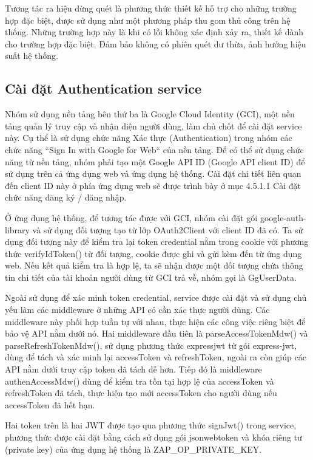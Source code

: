 Tương tác ra hiệu dừng quét là phương thức thiết kế hỗ trợ cho những trường hợp đặc biệt, được sử dụng như một phương pháp thu gom thủ công trên hệ thống. Những trường hợp này là khi có lỗi không xác định xảy ra, thiết kế dành cho trường hợp đặc biệt. Đảm bảo không có phiên quét dư thừa, ảnh hưởng hiệu suất hệ thống.

\subsection{Cài đặt Authentication service}

\tab Nhóm sử dụng nền tảng bên thứ ba là Google Cloud Identity (GCI), một nền tảng quản lý truy cập và nhận diện người dùng, làm chủ chốt để cài đặt service này. Cụ thể là sử dụng chức năng Xác thực (Authentication) trong nhóm các chức năng “Sign In with Google for Web“ của nền tảng. Để có thể sử dụng chức năng từ nền tảng, nhóm phải tạo một Google API ID (Google API client ID) để sử dụng trên cả ứng dụng web và ứng dụng hệ thống. Cài đặt chi tiết liên quan đến client ID này ở phía ứng dụng web sẽ được trình bày ở mục 4.5.1.1 Cài đặt chức năng đăng ký / đăng nhập.
\par

Ở ứng dụng hệ thống, để tương tác được với GCI, nhóm cài đặt gói google-auth-library và sử dụng đối tượng tạo từ lớp OAuth2Client với client ID đã có. Ta sử dụng đối tượng này để kiểm tra lại token credential nằm trong cookie với phương thức verifyIdToken() từ đối tượng, cookie được ghi và gửi kèm đến từ ứng dụng web. Nếu kết quả kiểm tra là hợp lệ, ta sẽ nhận được một đối tượng chứa thông tin chi tiết của tài khoản người dùng từ GCI trả về, nhóm gọi là GgUserData.
\par

Ngoài sử dụng để xác minh token credential, service được cài đặt và sử dụng chủ yếu làm các middleware ở những API có cần xác thực người dùng. Các middleware này phối hợp tuần tự với nhau, thực hiện các công việc riêng biệt để bảo vệ API nằm dưới nó. Hai middleware đầu tiên là parseAccessTokenMdw() và parseRefreshTokenMdw(), sử dụng phương thức expressjwt từ gói express-jwt, dùng để tách và xác minh lại accessToken và refreshToken, ngoài ra còn giúp các API nằm dưới truy cập token đã tách dễ hơn. Tiếp đó là middleware authenAccessMdw() dùng để kiểm tra tồn tại hợp lệ của accessToken và refreshToken đã tách, thực hiện tạo mới accessToken cho người dùng nếu accessToken đã hết hạn.
\par

Hai token trên là hai JWT được tạo qua phương thức signJwt() trong service, phương thức được cài đặt bằng cách sử dụng gói jsonwebtoken và khóa riêng tư (private key) của ứng dụng hệ thống là ZAP\_OP\_PRIVATE\_KEY.

